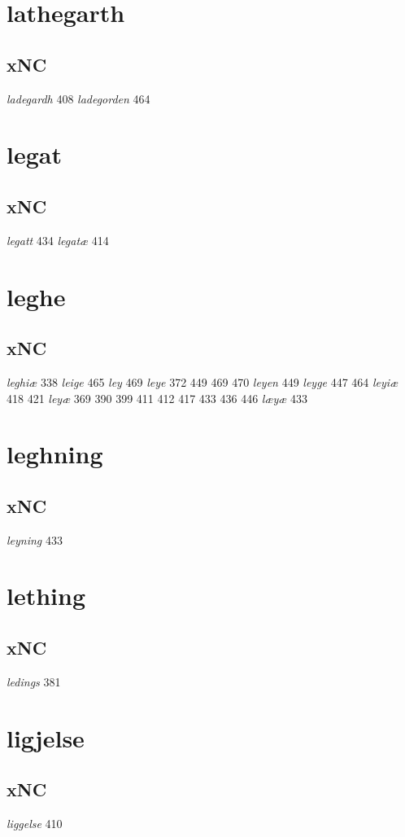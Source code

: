\documentclass[a4paper,twocolumn]{article}
\begin{document}
\section{lathegarth}
\label{sec:org3a9b1e4}
\subsection{xNC}
\label{sec:orgbc024ef}
\emph{ladegardh} 408 \emph{ladegorden} 464 
\section{legat}
\label{sec:orgb663bcf}
\subsection{xNC}
\label{sec:orgba43c22}
\emph{legatt} 434 \emph{legatæ} 414 
\section{leghe}
\label{sec:org341ed2e}
\subsection{xNC}
\label{sec:org2d15f5e}
\emph{leghiæ} 338 \emph{leige} 465 \emph{ley} 469 \emph{leye} 372 449 469 470 \emph{leyen} 449 \emph{leyge} 447 464 \emph{leyiæ} 418 421 \emph{leyæ} 369 390 399 411 412 417 433 436 446 \emph{læyæ} 433 
\section{leghning}
\label{sec:org57ff093}
\subsection{xNC}
\label{sec:org13278fb}
\emph{leyning} 433 
\section{lething}
\label{sec:org7a5a4e7}
\subsection{xNC}
\label{sec:org277782b}
\emph{ledings} 381 
\section{ligjelse}
\label{sec:org3192d2e}
\subsection{xNC}
\label{sec:orgab0a02c}
\emph{liggelse} 410 
\end{document}

